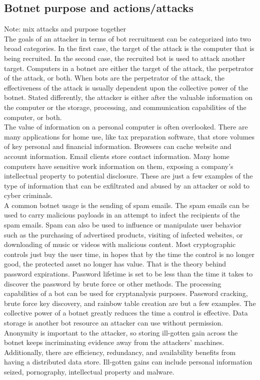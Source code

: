 \subsection{Botnet purpose and actions/attacks}
Note: mix attacks and purpose together\\
The goals of an attacker in terms of bot recruitment can be categorized into two
broad categories. In the first case, the target of the attack is the computer that is being recruited. In the second case, the recruited bot is used to attack another target. Computers in a botnet are either the target of the attack, the perpetrator of the attack, or both. When bots are the perpetrator of the attack, the effectiveness of the attack is usually dependent upon the collective power of the botnet. Stated differently, the attacker is either after the valuable information on the computer or the storage, processing, and communication capabilities of the computer, or both. \\
The value of information on a personal computer is often overlooked. There are
many applications for home use, like tax preparation software, that store volumes of key personal and financial information. Browsers can cache website and account information. Email clients store contact information. Many home computers have sensitive work information on them, exposing a company's intellectual property to potential disclosure. These are just a few examples of the type of information that can be exfiltrated and abused by an attacker or sold to cyber criminals.\\A common botnet usage is the sending of spam emails. The spam emails can be used to carry malicious payloads in an attempt to infect the recipients of the spam emails. Spam can also be used to influence or manipulate user behavior such as the purchasing of advertised products, visiting of infected websites, or downloading of music or videos with malicious content.
Most cryptographic controls just buy the user time, in hopes that by the time the control is no longer good, the protected asset no longer has value. That is the theory behind password expirations. Password lifetime is set to be less than the time it takes to discover the password by brute force or other methods. The processing capabilities of a bot can be used for cryptanalysis purposes. Password cracking, brute force key discovery, and rainbow table creation are but a few examples. The collective power of a botnet greatly reduces the time a control is effective. Data storage is another bot resource an attacker can use without permission. Anonymity is important to the attacker, so storing ill-gotten gain across the botnet keeps incriminating evidence away from the attackers' machines. Additionally, there are efficiency, redundancy, and availability benefits from having a distributed data store. Ill-gotten gains can include personal information seized, pornography, intellectual property and malware.\\
